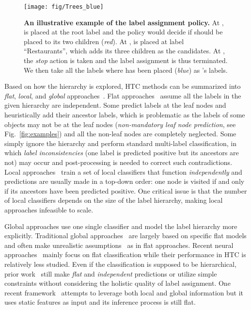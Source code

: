 \documentclass[11pt,a4paper]{article}
\begin{document}
\begin{figure*}[ht]
    \centering
    \texttt{[image: fig/Trees\_blue]}
    \vspace*{-.15cm}
     \caption{\textbf{An illustrative example of the label assignment policy.} At ,  is placed at the root label and the policy would decide if  should be placed to its two children (\textit{red}). At ,  is placed at label ``Restaurants'', which adds its three children as the candidates. At , the \textit{stop} action is taken and the label assignment is thus terminated. We then take all the labels where  has been placed (\textit{blue}) as 's labels.}
    \label{fig:example}
    \vspace*{-.2cm}
\end{figure*}

Based on how the hierarchy is explored, HTC methods can be summarized into \textit{flat}, \textit{local}, and \textit{global} approaches~\citep{silla2011survey}.
Flat approaches~\cite{hayete2005gotrees,johnson2014effective} assume all the labels in the given hierarchy are independent. 
Some predict labels at the leaf nodes and heuristically add their ancestor labels, which is problematic as the labels of some objects may not be at the leaf nodes (\textit{non-mandatory leaf node prediction}, see Fig.~\ref{fig:examples}) and all the non-leaf nodes are completely neglected.
Some simply ignore the hierarchy and perform standard multi-label classification, in which \textit{label inconsistencies} (one label is predicted positive but its ancestors are not) may occur and post-processing is needed to correct such contradictions. 
Local approaches~\cite{koller1997hierarchically,cesa2006hierarchical} train a set of local classifiers that function \textit{independently} and predictions are usually made in a top-down order: one node is visited if and only if its ancestors have been predicted positive.
One critical issue is that the number of local classifiers depends on the size of the label hierarchy, making local approaches infeasible to scale.

Global approaches use one single classifier and model the label hierarchy more explicitly.
Traditional global approaches~\citep{wang2001hierarchical,silla2009global} are largely based on specific flat models and often make unrealistic assumptions~\cite{cai2004hierarchical} as in flat approaches.
Recent neural approaches~\citep{kim2014convolutional,yang2016hierarchical} mainly focus on flat classification while their performance in HTC is relatively less studied.
Even if the classification is supposed to be hierarchical, prior work~\citep{gopal2013recursive,johnson2014effective,peng2018large} still make \textit{flat} and \textit{independent} predictions or utilize simple constraints without considering the holistic quality of label assignment.
One recent framework~\citep{wehrmann2018hierarchical} attempts to leverage both local and global information but it uses static features as input and its inference process is still flat.
\end{document}
